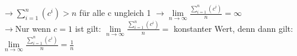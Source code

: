 \documentclass[12pt,a4paper]{article}
\begin{document}
\begin{enumerate}
\begin{enumerate}
\begin{enumerate}
$\rightarrow \sum\limits_{i=1}^{n}(c^i) > n$ für alle c ungleich 1 $\rightarrow  \lim\limits_{n \to \infty}\frac{{\sum\limits_{i=1}^{n}{(c^{i})}}}{n} = \infty $\\
$\rightarrow $Nur wenn $c = 1$ ist gilt: $\lim\limits_{n \to \infty}\frac{{\sum\limits_{i=1}^{n}{(c^{i})}}}{n} =$ konstanter Wert, denn dann gilt:$ \lim\limits_{n \to \infty}\frac{{\sum\limits_{i=1}^{n}{(c^{i})}}}{n} = \frac{1}{n}$ 
  \end{enumerate}
  \end{enumerate}
\end{enumerate}
\end{document}
